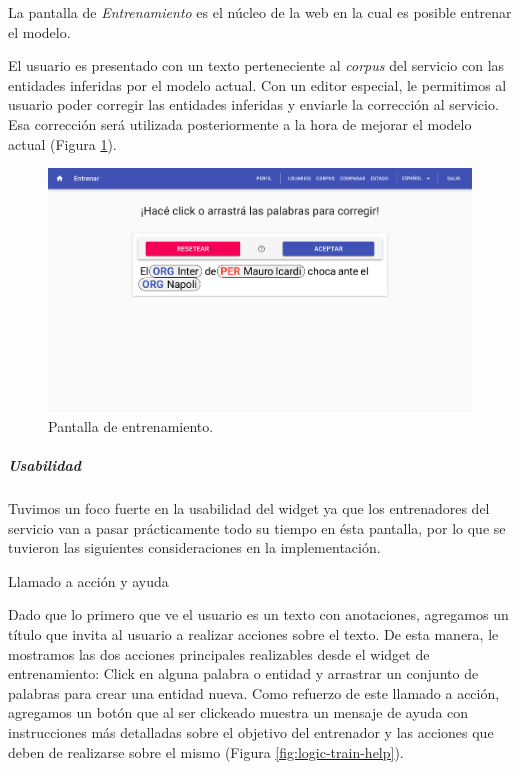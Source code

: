 \documentclass[12pt,a4paper,]{scrartcl}
\let\oldsubparagraph\subparagraph
\renewcommand{\subparagraph}[1]{\oldsubparagraph{#1}\mbox{}}
\begin{document}
La pantalla de \emph{Entrenamiento} es el núcleo de la web en la cual es posible entrenar el modelo.

El usuario es presentado con un texto perteneciente al \emph{corpus} del servicio con las entidades inferidas por el modelo actual. Con un editor especial, le permitimos al usuario poder corregir las entidades inferidas y enviarle la corrección al servicio. Esa corrección será utilizada posteriormente a la hora de mejorar el modelo actual (Figura \ref{fig:logic-train}).

\begin{figure}[H]

{\centering \includegraphics{assets/logic/train.pdf} 

}

\caption{Pantalla de entrenamiento.}\label{fig:logic-train}
\end{figure}

\hypertarget{usabilidad}{%
\subparagraph{Usabilidad}\label{usabilidad}}

Tuvimos un foco fuerte en la usabilidad del widget ya que los entrenadores del servicio van a pasar prácticamente todo su tiempo en ésta pantalla, por lo que se tuvieron las siguientes consideraciones en la implementación.

Llamado a acción y ayuda

Dado que lo primero que ve el usuario es un texto con anotaciones, agregamos un título que invita al usuario a realizar acciones sobre el texto. De esta manera, le mostramos las dos acciones principales realizables desde el widget de entrenamiento: Click en alguna palabra o entidad y arrastrar un conjunto de palabras para crear una entidad nueva.
Como refuerzo de este llamado a acción, agregamos un botón que al ser clickeado muestra un mensaje de ayuda con instrucciones más detalladas sobre el objetivo del entrenador y las acciones que deben de realizarse sobre el mismo (Figura \ref{fig:logic-train-help}).
\end{document}
